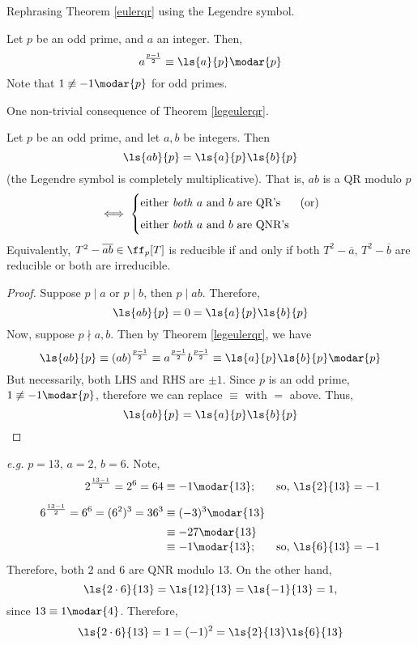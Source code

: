 \vspace*{1em}

Rephrasing Theorem \ref{eulerqr} using the Legendre symbol.
\begin{theorem}[Euler]\label{legeulerqr}
Let $p$ be an odd prime, and $a$ an integer. Then,
\[a^{\frac{p-1}{2}} \equiv \ls{a}{p}\modar{p}\]
Note that $1 \not\equiv -1\modar{p}$ for odd primes.
\end{theorem}

\vspace*{1em}

One non-trivial consequence of Theorem \ref{legeulerqr}.
\begin{corollary}
Let $p$ be an odd prime, and let $a,b$ be integers. Then
\[\ls{ab}{p} = \ls{a}{p}\ls{b}{p}\]
(the Legendre symbol is completely multiplicative). That is, $ab$ is a QR modulo $p$
\[\iff \begin{cases}\text{either \emph{both} $a$ and $b$ are QR's} & \text{(or)}\\[0.5em] \text{either \emph{both} $a$ and $b$ are QNR's} \end{cases}\]
Equivalently, $T^2 - \overline{ab} \in \ff_p[T]$ is reducible if and only if both $T^2 - \overline{a},\, T^2 - \overline{b}$ are reducible or both are irreducible.
\end{corollary}
\begin{proof}
Suppose $p\mid a$ or $p\mid b$, then $p\mid ab$. Therefore,
\[\ls{ab}{p} = 0 = \ls{a}{p}\ls{b}{p}\]
Now, suppose $p\nmid a,b$. Then by Theorem \ref{legeulerqr}, we have
\[\ls{ab}{p} \equiv (ab)^{\frac{p-1}{2}} \equiv a^{\frac{p-1}{2}}b^{\frac{p-1}{2}} \equiv \ls{a}{p}\ls{b}{p}\modar{p}\]
But necessarily, both LHS and RHS are $\pm 1$. Since $p$ is an odd prime, $1 \not\equiv -1\modar{p}$, therefore we can replace $\equiv$ with $=$ above. Thus,
\[\ls{ab}{p} = \ls{a}{p}\ls{b}{p}\]
\end{proof}

\vspace*{0.5em}

\emph{e.g.} $p = 13,\, a = 2,\, b = 6$. Note,
\begin{align*}
2^{\frac{13-1}{2}} = 2^6 = 64 &\equiv -1\modar{13}; & \text{so, } \ls{2}{13} &= -1\\[0.5em]
6^{\frac{13-1}{2}} = 6^6 = (6^2)^3 = 36^3 &\equiv (-3)^3\modar{13}\\[0.2em]
&\equiv -27\modar{13}\\[-0.2em]
&\equiv -1\modar{13}; & \text{so, } \ls{6}{13} &= -1
\end{align*}
Therefore, both $2$ and $6$ are QNR modulo $13$. On the other hand, 
\[\ls{2\cdot 6}{13} = \ls{12}{13} = \ls{-1}{13} = 1,\]
since $13 \equiv 1 \modar{4}$. Therefore,
\[\ls{2\cdot 6}{13} = 1 = (-1)^2 = \ls{2}{13}\ls{6}{13}\]

